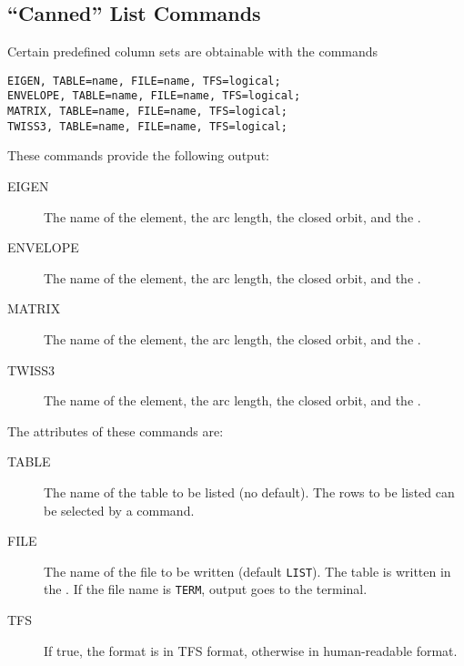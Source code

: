 \subsection{``Canned'' List Commands}
\label{sec:canned}
Certain predefined column sets are obtainable with the commands
\begin{verbatim}
EIGEN, TABLE=name, FILE=name, TFS=logical;
ENVELOPE, TABLE=name, FILE=name, TFS=logical;
MATRIX, TABLE=name, FILE=name, TFS=logical;
TWISS3, TABLE=name, FILE=name, TFS=logical;
\end{verbatim}
These commands provide the following output:
\begin{description}
\item[EIGEN]
  The name of the element, the arc length, the closed orbit,
  and the .
\item[ENVELOPE]
  The name of the element, the arc length, the closed orbit,
  and the .
\item[MATRIX]
  The name of the element, the arc length, the closed orbit,
  and the .
\item[TWISS3]
  The name of the element, the arc length, the closed orbit,
  and the .
\end{description}
The attributes of these commands are:
\begin{description}
\item[TABLE]
  The name of the table to be listed (no default). 
  The rows to be listed can be selected by a
   command.
\item[FILE]
  The name of the file to be written (default \texttt{LIST}).
  The table is written in the .
  If the file name is \texttt{TERM}, output goes to the terminal.
\item[TFS]
  If true, the format is in TFS format, otherwise in human-readable
  format. 
\end{description}

